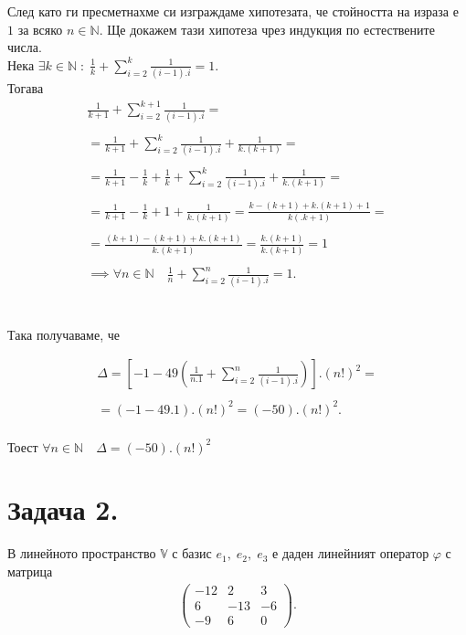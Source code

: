 \documentclass[a4paper, 12pt]{article}
\newcommand{\N}{\mathbb{N}}
\begin{document}
    След като ги пресметнахме си изграждаме хипотезата, че стойността на израза е $1$ за всяко $n \in \N$.
    Ще докажем тази хипотеза чрез индукция по естествените числа. \\
    
    Нека $\exists k \in \N \; : \; \frac{1}{k} + \displaystyle\sum_{i = 2}^{k}\frac{1}{(i - 1).i} = 1$.\\

    Тогава  \begin{align*}
    \frac{1}{k + 1} + \displaystyle\sum_{i = 2}^{k + 1}\frac{1}{(i - 1).i} = \\\\
    = \frac{1}{k + 1} + \displaystyle\sum_{i = 2}^{k}\frac{1}{(i - 1).i} + \frac{1}{k.(k + 1)} = \\\\
    = \frac{1}{k + 1} - \frac{1}{k} + \frac{1}{k} + \displaystyle\sum_{i = 2}^{k}\frac{1}{(i - 1).i} + \frac{1}{k.(k + 1)} = \\\\
    = \frac{1}{k + 1} - \frac{1}{k} + 1 + \frac{1}{k.(k + 1)} = \frac{k - (k + 1) + k.(k + 1) + 1}{k(.k + 1)} = \\\\
    = \frac{(k + 1)-(k + 1) + k.(k + 1)}{k.(k + 1)} = \frac{k.(k + 1)}{k.(k + 1)} = 1 \\\\
    \implies \forall n \in \N \quad \frac{1}{n} + \displaystyle\sum_{i = 2}^{n}\frac{1}{(i - 1).i} = 1.
    \end{align*} \\\\

    Така получаваме, че

    \begin{align*}
        \Delta = \left[-1 -49\left(\frac{1}{n.1} + \displaystyle\sum_{i = 2}^n \frac{1}{(i - 1).i}\right)\right].(n!)^2 = \\\\
        = (-1 - 49.1).(n!)^2 = (-50).(n!)^2.
    \end{align*} \\

    Тоест $\forall n \in \N \quad \Delta = (-50).(n!)^2$
    \section*{Задача 2.}
    В линейното пространство $\mathbb{V}$ с базис $e_1, \; e_2, \; e_3$
    е даден линейният оператор $\varphi$ с матрица
    \begin{align*}
        \begin{pmatrix}
            -12 & 2 & 3\\
            6 & -13 & -6\\
            -9 & 6 & 0
        \end{pmatrix}.
    \end{align*}
\end{document}
